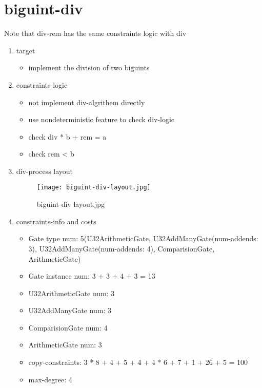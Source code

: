 \section{biguint-div}
\label{biguint-div}

Note that div-rem has the same constraints logic with div

\begin{enumerate}
    \item target
        \begin{itemize}
            \item implement the division of two biguints
        \end{itemize}
    \item constraints-logic
        \begin{itemize}
            \item not implement div-algrithem directly
            \item use nondeterministic feature to check div-logic
            \item check div * b + rem = a
            \item check rem < b
        \end{itemize}
    \item div-process layout
        \begin{figure}[!ht]
            \centering
            \texttt{[image: biguint-div-layout.jpg]}
            \caption{biguint-div layout.jpg}
            \label{fig:biguint-div-layout.jpg}
        \end{figure}
    
    \item constraints-info and costs
        \begin{itemize}
            \item Gate type num: 5(U32ArithmeticGate, U32AddManyGate(num-addends: 3), U32AddManyGate(num-addends: 4), ComparisionGate, ArithmeticGate)
            \item Gate instance num: 3 + 3 + 4 + 3 = 13 
            \item U32ArithmeticGate num: 3
            \item U32AddManyGate num: 3
            \item ComparisionGate num: 4
            \item ArithmeticGate num: 3
            \item copy-constraints: 3 * 8 + 4 + 5 + 4 + 4 * 6 + 7 + 1 + 26 + 5 = 100 
            \item max-degree: 4
        \end{itemize}

\end{enumerate}